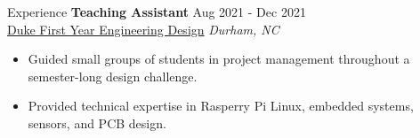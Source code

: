 \documentclass{resume}
\begin{document}
\begin{rSection}{Experience}
\textbf{Teaching Assistant} \hfill Aug 2021 - Dec 2021\\
\href{https://fyd.duke.edu/}{Duke First Year Engineering Design} \hfill \textit{Durham, NC}
\begin{itemize}
    \itemsep -3pt {} 
    \item Guided small groups of students in project management throughout a semester-long design challenge.
    \item Provided technical expertise in Rasperry Pi Linux, embedded systems, sensors, and PCB design.\
\end{itemize}




\end{rSection} 

\end{document}
